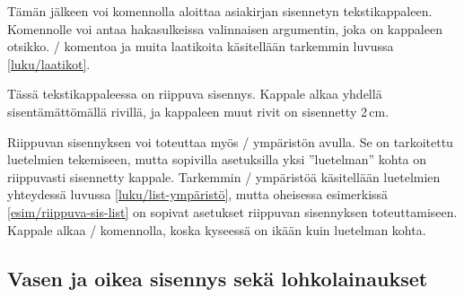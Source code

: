 \begin{koodilohkosis}
\newlength{\sarkain}
\setlength{\sarkain}{23mm}
\newcommand{\kappale}[1][]{\par\hangpara{2\sarkain}{1}%
  \makebox[2\sarkain][l]{\ignorespaces #1}\ignorespaces}
\end{koodilohkosis}

\noindent
Tämän jälkeen voi komennolla  aloittaa asiakirjan
sisennetyn tekstikappaleen. Komennolle voi antaa hakasulkeissa
valinnaisen argumentin, joka on kappaleen otsikko. \-/
komentoa ja muita laatikoita käsitellään tarkemmin luvussa
\ref{luku/laatikot}.

\begin{esimerkki*}
  \komentoi{,}

\begin{koodilohko}
\begin{list}{}{
    \setlength{\leftmargin}{2cm}
    \setlength{\itemindent}{-2cm}
  }
\item Tässä tekstikappaleessa on riippuva sisennys. Kappale alkaa
  yhdellä sisentämättömällä rivillä, ja kappaleen muut rivit on
  sisennetty 2\,cm.
\end{list}
\end{koodilohko}
  \caption{Riippuvan sisennyksen toteuttaminen \-/
    ympäristön avulla}
  \label{esim/riippuva-sis-list}
\end{esimerkki*}

Riippuvan sisennyksen voi toteuttaa myös \-/ ympäristön
avulla. Se on tarkoitettu luetelmien tekemiseen, mutta sopivilla
asetuksilla yksi ''luetelman'' kohta on riippuvasti sisennetty kappale.
Tarkemmin \-/ ympäristöä käsitellään luetelmien
yhteydessä luvussa \ref{luku/list-ympäristö}, mutta oheisessa
esimerkissä \ref{esim/riippuva-sis-list} on sopivat asetukset riippuvan
sisennyksen toteuttamiseen. Kappale alkaa \-/ komennolla,
koska kyseessä on ikään kuin luetelman kohta.

\subsection{Vasen ja oikea sisennys sekä lohkolainaukset}
\label{luku/lohkolainaukset}

